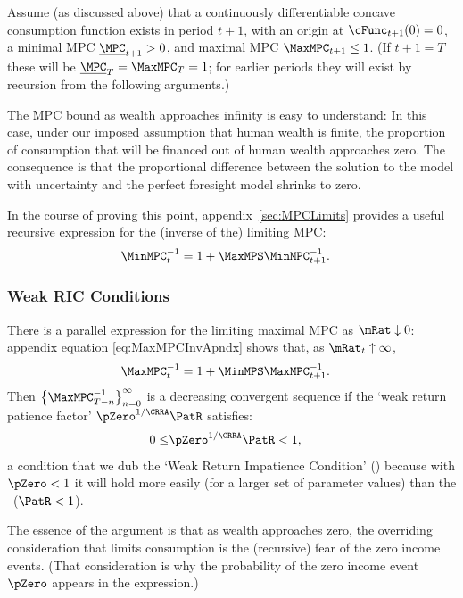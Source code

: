 \documentclass[BufferStockTheory]{subfiles}
\begin{document}
\newcommand{\NewMaxMinMPC}{\ushort{\MPC}}

Assume (as discussed above) that a continuously differentiable
concave consumption function exists in period $t+1$, with an origin at
$\cFunc_{t+1}(0)=0$, a minimal MPC $\NewMaxMinMPC_{t+1}>0$, and
maximal MPC $\MaxMPC_{t+1} \leq 1$.  (If $t+1 = T$ these will be
$\NewMaxMinMPC_{T}=\MaxMPC_{T}=1$; for earlier periods they will exist
by recursion from the following arguments.)

The MPC bound as wealth approaches infinity is easy to understand: In this case,
under our imposed assumption that human wealth is finite, the proportion of consumption
that will be financed out of human wealth approaches zero. The
consequence is that the proportional difference between the solution to the
model with uncertainty and the perfect foresight model shrinks to zero.

\hypertarget{MPCnvrsLower}{}
\hypertarget{WRICCond}{}
In the course of proving this point, appendix~\ref{sec:MPCLimits}  provides a useful recursive expression for the (inverse of the) limiting MPC: 
\begin{align}
  \MinMPC_{t}^{-1}  & = 1+\MaxMPS \MinMPC_{t+1}^{-1} \label{eq:MinMPCInv}.
\end{align}

\subsubsection{Weak RIC Conditions}{}
\hypertarget{MPCnvrsUpper}{}
\hypertarget{WRIC}{}
There is a parallel expression for the limiting maximal 
MPC as $\mRat \downarrow 0$: appendix equation \eqref{eq:MaxMPCInvApndx}  shows that, as $\mRat_{t} \uparrow \infty$,
\begin{align}
  \MaxMPC_{t}^{-1}  & = 1+\MinMPS \MaxMPC_{t+1}^{-1} \label{eq:MaxMPCInv}.
\end{align}
\hypertarget{WRIF}{}  
Then
$\left\{\MaxMPC_{T-n}^{-1}\right\} _{n=0}^{\infty}$ is a decreasing %
convergent sequence if the `weak return patience factor' $\pZero^{1/\CRRA}\PatR$ satisfies:
\begin{align}
  0 \leq & \pZero^{1/\CRRA} \PatR < 1 \label{eq:WRIC},
\end{align}
a condition that we dub the `Weak Return Impatience Condition' (\WRIC)
because with $\pZero < 1$ it will hold more easily (for a larger set of parameter
values) than the \RIC~($\PatR < 1$).

The essence of the argument is that as wealth approaches zero, the overriding
consideration that limits consumption is the (recursive) fear of the zero
income events.  (That consideration is why the probability of the zero
income event $\pZero$ appears in the expression.)  
\end{document}
